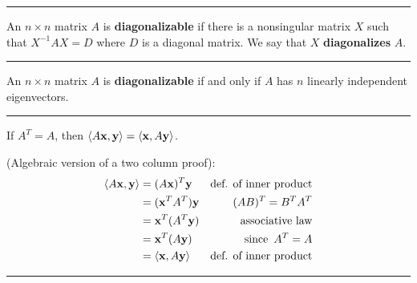 \begin{questions}
\rule[0.001in]{\textwidth}{0.00025in}


\question  An $n \times n$ matrix $A$ is \textbf{diagonalizable} if there is a nonsingular matrix $X$ such that $X^{-1}AX = D$ where $D$ is a diagonal matrix.  We say that $X$ \textbf{diagonalizes} $A$.

\rule[0.001in]{\textwidth}{0.00025in}



\question An $n \times n$ matrix $A$ is \textbf{diagonalizable} if and only if $A$ has $n$ linearly independent eigenvectors.  


\rule[0.001in]{\textwidth}{0.00025in}



\question If $A^T = A$, then $\langle A{\bf x},{\bf y} \rangle = \langle {\bf x}, A{\bf y} \rangle$.

\proof  (Algebraic version of a two column proof):
\begin{align*} \langle A{\bf x},{\bf y} \rangle &= (A{\bf x})^T {\bf y} &  \text{def. of inner product}  \\
										&= ({\bf x}^T A^T) {\bf y} &  (AB)^T = B^TA^T \\
										&= {\bf x}^T (A^T {\bf y}) & \text{associative law}  \\
										&= {\bf x}^T (A {\bf y})     &  \text{since }  \, A^T=A \\
										&= \langle {\bf x}, A{\bf y}    \rangle &  \text{def. of inner product}
	\end{align*}

\rule[0.001in]{\textwidth}{0.00025in}
































\end{questions}
